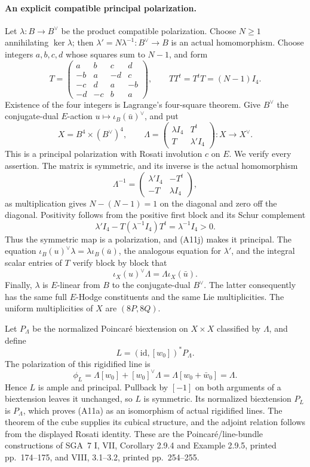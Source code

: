\paragraph{An explicit compatible principal polarization.}
Let $\lambda:B\to B^\vee$ be the product compatible
polarization.  Choose $N\geq1$ annihilating $\ker\lambda$;
then $\lambda'=N\lambda^{-1}:B^\vee\to B$ is an actual
homomorphism.  Choose integers $a,b,c,d$ whose squares sum to
$N-1$, and form
\[
 T=\begin{pmatrix}
 a&b&c&d\\-b&a&-d&c\\-c&d&a&-b\\-d&-c&b&a
 \end{pmatrix},\qquad
 TT^t=T^tT=(N-1)I_4.
\]
Existence of the four integers is Lagrange's four-square
theorem.  Give $B^\vee$ the conjugate-dual $E$-action
$u\mapsto\iota_B(\bar u)^\vee$, and put
\[
 X=B^4\times(B^\vee)^4,\qquad
 \Lambda=
 \begin{pmatrix}\lambda I_4&T^t\\T&\lambda'I_4\end{pmatrix}
       :X\longrightarrow X^\vee.
 \tag{A11i}
\]
This is a principal polarization with Rosati involution $c$
on $E$.  We verify every assertion.  The matrix is symmetric,
and its inverse is the actual homomorphism
\[
 \Lambda^{-1}=
 \begin{pmatrix}\lambda'I_4&-T^t\\-T&\lambda I_4\end{pmatrix},
 \tag{A11j}
\]
as multiplication gives $N-(N-1)=1$ on the diagonal and zero
off the diagonal.  Positivity follows from the positive first
block and its Schur complement
\[
       \lambda'I_4-T(\lambda^{-1}I_4)T^t
                         =\lambda^{-1}I_4>0.
\]
Thus the symmetric map is a polarization, and (A11j) makes it
principal.  The equation
$\iota_B(u)^\vee\lambda=\lambda\iota_B(\bar u)$,
the analogous equation for $\lambda'$, and the integral scalar
entries of $T$ verify block by block that
\[
       \iota_X(u)^\vee\Lambda=\Lambda\iota_X(\bar u).
\]
Finally, $\lambda$ is $E$-linear from $B$ to the
conjugate-dual $B^\vee$.  The latter consequently has the same
full $E$-Hodge constituents and the same Lie multiplicities.
The uniform multiplicities of $X$ are $(8P,8Q)$.

Let $P_\Lambda$ be the normalized Poincar\'e biextension on
$X\times X$ classified by $\Lambda$, and define
\[
                 L=(\mathrm{id},[w_0])^*P_\Lambda.
 \tag{A11k}
\]
The polarization of this rigidified line is
\[
  \phi_L=\Lambda[w_0]+[w_0]^\vee\Lambda
          =\Lambda[w_0+\bar w_0]=\Lambda.
\]
Hence $L$ is ample and principal.  Pullback by $[-1]$ on both
arguments of a biextension leaves it unchanged, so $L$ is
symmetric.  Its normalized biextension $P_L$ is $P_\Lambda$,
which proves (A11a) as an isomorphism of actual rigidified
lines.  The theorem of the cube supplies its cubical structure,
and the adjoint relation follows from the displayed Rosati
identity.  These are the Poincar\'e/line-bundle constructions of
SGA~7 I, VII, Corollary 2.9.4 and Example 2.9.5, printed
pp.~174--175, and VIII, 3.1--3.2, printed pp.~254--255.


